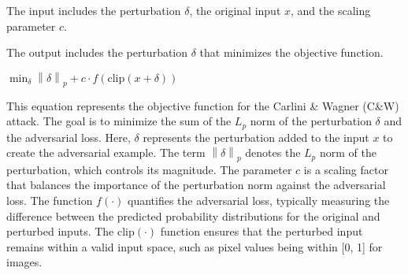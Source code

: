 The input includes the perturbation $\delta$, the original input $x$, and the scaling parameter $c$.

The output includes the perturbation $\delta$ that minimizes the objective function.

$\min_{\delta} \left\| \delta \right\|_p + c \cdot f(\text{clip}(x + \delta))$


This equation represents the objective function for the Carlini \& Wagner (C\&W) attack. The goal is to minimize the sum of the $L_p$ norm of the perturbation $\delta$ and the adversarial loss. Here, $\delta$ represents the perturbation added to the input $x$ to create the adversarial example. The term $\left\| \delta \right\|_p$ denotes the $L_p$ norm of the perturbation, which controls its magnitude. The parameter $c$ is a scaling factor that balances the importance of the perturbation norm against the adversarial loss. The function $f(\cdot)$ quantifies the adversarial loss, typically measuring the difference between the predicted probability distributions for the original and perturbed inputs. The $\text{clip}(\cdot)$ function ensures that the perturbed input remains within a valid input space, such as pixel values being within [0, 1] for images.
